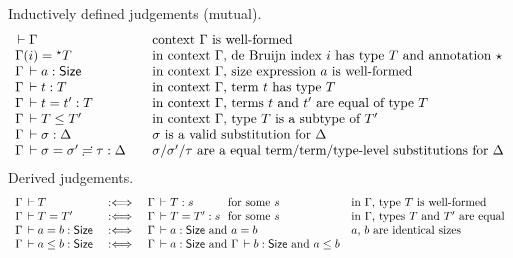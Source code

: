 \begin{figure}[htbp]
\flushleft
Inductively defined judgements (mutual).
\[
\begin{array}{l@{\qquad}l}
  \der \Gamma & \mbox{context $\Gamma$ is well-formed} \\
  \Gamma(i) = \eann T & \mbox{in context $\Gamma$, de Bruijn index $i$ has type $T$ and annotation $\evar$} \\
  \Gamma \der a : \Size & \mbox{in context $\Gamma$, size expression $a$ is well-formed} \\
  \Gamma \der t : T & \mbox{in context $\Gamma$, term $t$ has type $T$} \\
  \Gamma \der t = t' : T & \mbox{in context $\Gamma$, terms $t$ and $t'$ are equal of type $T$} \\
  \Gamma \der T \leq T' & \mbox{in context $\Gamma$, type $T$ is a subtype of $T'$} \\
  \Gamma \der \sigma : \Delta & \mbox{$\sigma$ is a valid substitution for $\Delta$} \\
  \sueq \Gamma \sigma {\sigma'} \tau \Delta & \mbox{$\sigma$/$\sigma'$/$\tau$ are a equal term/term/type-level substitutions for $\Delta$} \\
\end{array}
\]
Derived judgements.
\[
\begin{array}{l@{\quad}l@{\quad}l@{~}l@{~~}l}
  \Gamma \der T & \defas & \Gamma \der T : s & \mforsome s
    & \mbox{in $\Gamma$, type $T$ is well-formed} \\
  \Gamma \der T = T' & \defas & \Gamma \der T = T' : s & \mforsome s
    & \mbox{in $\Gamma$, types $T$ and $T'$ are equal} \\
  \Gamma \der a = b : \Size & \defas &
    \multicolumn 2 {@{}l@{\quad}} {\Gamma \der a : \Size \mand a = b}
    & \mbox{$a$, $b$ are identical sizes} \\
  \Gamma \der a \leq b : \Size & \defas &
     \multicolumn 2 {@{}l@{\quad}} {\Gamma \der a : \Size \mand \Gamma \der b : \Size \mand a \leq b}

\end{array}\]
\end{figure}
